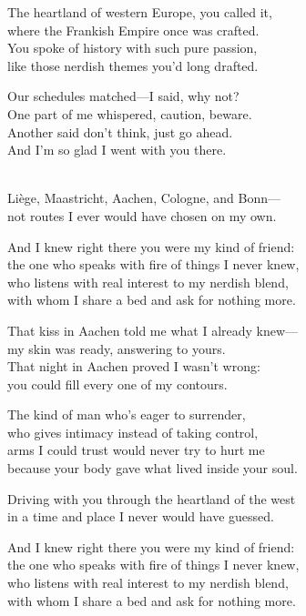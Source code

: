 \begin{lyrics}
The heartland of western Europe, you called it,\\
where the Frankish Empire once was crafted.\\
You spoke of history with such pure passion,\\
like those nerdish themes you’d long drafted.

Our schedules matched—I said, why not?\\
One part of me whispered, caution, beware.\\
Another said don’t think, just go ahead.\\
And I’m so glad I went with you there.

\\
Liège, Maastricht, Aachen, Cologne, and Bonn—\\
not routes I ever would have chosen on my own.

And I knew right there you were my kind of friend:\\
the one who speaks with fire of things I never knew,\\
who listens with real interest to my nerdish blend,\\
with whom I share a bed and ask for nothing more.

That kiss in Aachen told me what I already knew—\\
my skin was ready, answering to yours.\\
That night in Aachen proved I wasn’t wrong:\\
you could fill every one of my contours.

The kind of man who’s eager to surrender,\\
who gives intimacy instead of taking control,\\
arms I could trust would never try to hurt me\\
because your body gave what lived inside your soul.

Driving with you through the heartland of the west\\
in a time and place I never would have guessed.

And I knew right there you were my kind of friend:\\
the one who speaks with fire of things I never knew,\\
who listens with real interest to my nerdish blend,\\
with whom I share a bed and ask for nothing more.


\end{lyrics}
